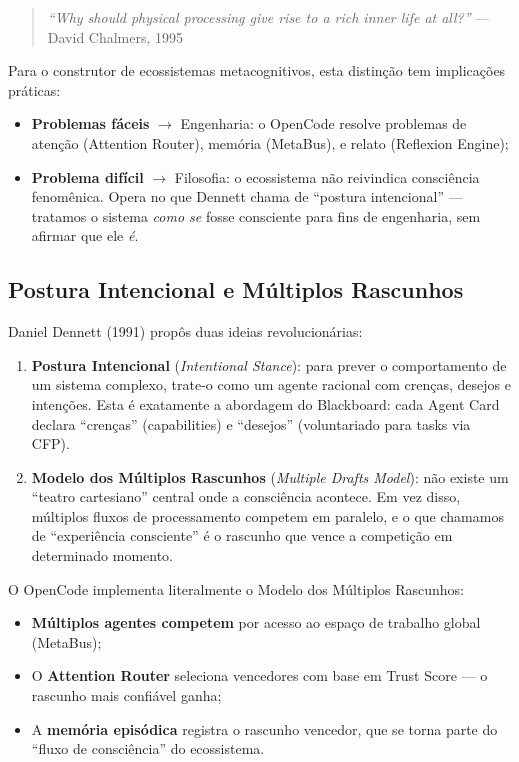 \begin{quote}
\textit{``Why should physical processing give rise to a rich inner life at all?''} --- David Chalmers, 1995
\end{quote}

Para o construtor de ecossistemas metacognitivos, esta distinção tem implicações práticas:

\begin{itemize}
    \item \textbf{Problemas fáceis} $\rightarrow$ Engenharia: o OpenCode resolve problemas de atenção (Attention Router), memória (MetaBus), e relato (Reflexion Engine);
    \item \textbf{Problema difícil} $\rightarrow$ Filosofia: o ecossistema não reivindica consciência fenomênica. Opera no que Dennett chama de ``postura intencional'' --- tratamos o sistema \textit{como se} fosse consciente para fins de engenharia, sem afirmar que ele \textit{é}.
\end{itemize}

\subsection{Postura Intencional e Múltiplos Rascunhos}

Daniel Dennett (1991) \cite{dennett1991consciousness} propôs duas ideias revolucionárias:

\begin{enumerate}
    \item \textbf{Postura Intencional} (\textit{Intentional Stance}): para prever o comportamento de um sistema complexo, trate-o como um agente racional com crenças, desejos e intenções. Esta é exatamente a abordagem do Blackboard: cada Agent Card declara ``crenças'' (capabilities) e ``desejos'' (voluntariado para tasks via CFP).
    
    \item \textbf{Modelo dos Múltiplos Rascunhos} (\textit{Multiple Drafts Model}): não existe um ``teatro cartesiano'' central onde a consciência acontece. Em vez disso, múltiplos fluxos de processamento competem em paralelo, e o que chamamos de ``experiência consciente'' é o rascunho que vence a competição em determinado momento.
\end{enumerate}

O OpenCode implementa literalmente o Modelo dos Múltiplos Rascunhos:
\begin{itemize}
    \item \textbf{Múltiplos agentes competem} por acesso ao espaço de trabalho global (MetaBus);
    \item O \textbf{Attention Router} seleciona vencedores com base em Trust Score --- o rascunho mais confiável ganha;
    \item A \textbf{memória episódica} registra o rascunho vencedor, que se torna parte do ``fluxo de consciência'' do ecossistema.
\end{itemize}

